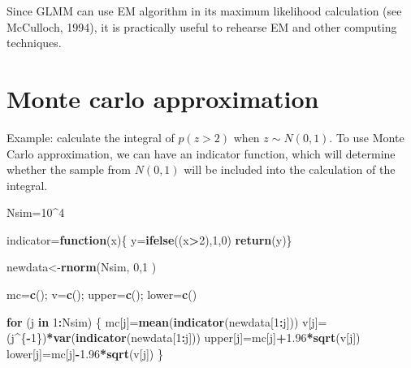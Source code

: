 \documentclass[]{book}
\newenvironment{Shaded}{\begin{snugshade}}{\end{snugshade}}
\newcommand{\KeywordTok}[1]{\textcolor[rgb]{0.13,0.29,0.53}{\textbf{#1}}}
\newcommand{\DecValTok}[1]{\textcolor[rgb]{0.00,0.00,0.81}{#1}}
\newcommand{\FloatTok}[1]{\textcolor[rgb]{0.00,0.00,0.81}{#1}}
\newcommand{\ControlFlowTok}[1]{\textcolor[rgb]{0.13,0.29,0.53}{\textbf{#1}}}
\newcommand{\OperatorTok}[1]{\textcolor[rgb]{0.81,0.36,0.00}{\textbf{#1}}}
\newcommand{\NormalTok}[1]{#1}
\begin{document}
Since GLMM can use EM algorithm in its maximum likelihood calculation
(see McCulloch, 1994), it is practically useful to rehearse EM and other
computing techniques.

\section{Monte carlo approximation}\label{monte-carlo-approximation}

Example: calculate the integral of \(p(z>2)\) when \(z \sim N(0,1)\). To
use Monte Carlo approximation, we can have an indicator function, which
will determine whether the sample from \(N(0,1)\) will be included into
the calculation of the integral.

\begin{Shaded}
\begin{Highlighting}[]
\NormalTok{Nsim=}\DecValTok{10}\OperatorTok{^}\DecValTok{4}

\NormalTok{indicator=}\ControlFlowTok{function}\NormalTok{(x)\{}
\NormalTok{y=}\KeywordTok{ifelse}\NormalTok{((x}\OperatorTok{>}\DecValTok{2}\NormalTok{),}\DecValTok{1}\NormalTok{,}\DecValTok{0}\NormalTok{)}
\KeywordTok{return}\NormalTok{(y)\}}

\NormalTok{newdata<-}\KeywordTok{rnorm}\NormalTok{(Nsim, }\DecValTok{0}\NormalTok{,}\DecValTok{1}\NormalTok{ )}

\NormalTok{mc=}\KeywordTok{c}\NormalTok{(); v=}\KeywordTok{c}\NormalTok{(); upper=}\KeywordTok{c}\NormalTok{(); lower=}\KeywordTok{c}\NormalTok{()}

\ControlFlowTok{for}\NormalTok{ (j }\ControlFlowTok{in} \DecValTok{1}\OperatorTok{:}\NormalTok{Nsim)}
\NormalTok{\{}
\NormalTok{mc[j]=}\KeywordTok{mean}\NormalTok{(}\KeywordTok{indicator}\NormalTok{(newdata[}\DecValTok{1}\OperatorTok{:}\NormalTok{j]))}
\NormalTok{v[j]=(j}\OperatorTok{^}\NormalTok{\{}\OperatorTok{-}\DecValTok{1}\NormalTok{\})}\OperatorTok{*}\KeywordTok{var}\NormalTok{(}\KeywordTok{indicator}\NormalTok{(newdata[}\DecValTok{1}\OperatorTok{:}\NormalTok{j]))}
\NormalTok{upper[j]=mc[j]}\OperatorTok{+}\FloatTok{1.96}\OperatorTok{*}\KeywordTok{sqrt}\NormalTok{(v[j])}
\NormalTok{lower[j]=mc[j]}\OperatorTok{-}\FloatTok{1.96}\OperatorTok{*}\KeywordTok{sqrt}\NormalTok{(v[j])}
\NormalTok{\}}


\end{Highlighting}
\end{Shaded}
\end{document}
